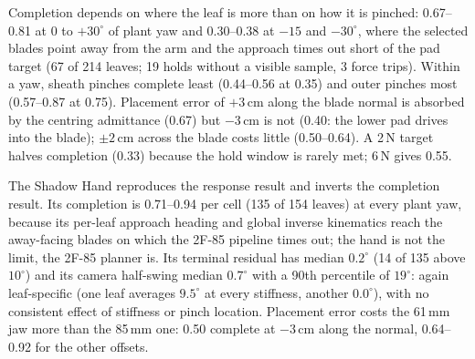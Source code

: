 \documentclass[letterpaper, 10 pt, conference]{ieeeconf}
\begin{document}
Completion depends on where the leaf is more than on how it is pinched: 0.67--0.81 at
$0$ to $+30^\circ$ of plant yaw and 0.30--0.38 at $-15$ and $-30^\circ$, where the selected
blades point away from the arm and the approach times out short of the pad target (67 of
214 leaves; 19 holds without a visible sample, 3 force trips). Within a yaw, sheath pinches
complete least (0.44--0.56 at 0.35) and outer pinches most (0.57--0.87 at 0.75). Placement
error of $+3$\,cm along the blade normal is absorbed by the centring admittance (0.67) but
$-3$\,cm is not (0.40: the lower pad drives into the blade); $\pm2$\,cm across the blade
costs little (0.50--0.64). A 2\,N target halves completion (0.33) because the hold window
is rarely met; 6\,N gives 0.55.

The Shadow Hand reproduces the response result and inverts the completion result. Its
completion is 0.71--0.94 per cell (135 of 154 leaves) at every plant yaw, because its
per-leaf approach heading and global inverse kinematics reach the away-facing blades on
which the 2F-85 pipeline times out; the hand is not the limit, the 2F-85 planner is. Its
terminal residual has median $0.2^\circ$ (14 of 135 above $10^\circ$) and its camera
half-swing median $0.7^\circ$ with a 90th percentile of $19^\circ$: again leaf-specific
(one leaf averages $9.5^\circ$ at every stiffness, another $0.0^\circ$), with no consistent
effect of stiffness or pinch location. Placement error costs the 61\,mm jaw more than the
85\,mm one: 0.50 complete at $-3$\,cm along the normal, 0.64--0.92 for the other offsets.
\end{document}
